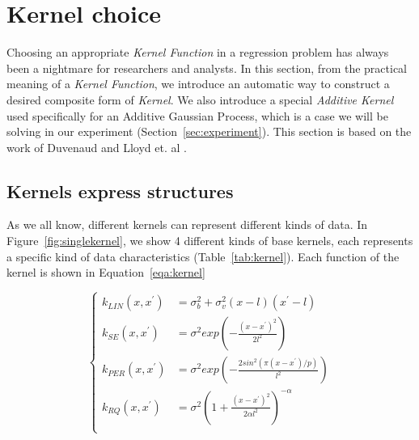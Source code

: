 \section{Kernel choice} \label{sec:autokernel}
Choosing an appropriate \emph{Kernel Function} in a regression problem has always been a nightmare for researchers and analysts. In this section, from the practical meaning of a \emph{Kernel Function}, we introduce an automatic way to construct a desired composite form of \emph{Kernel}.
We also introduce a special \emph{Additive Kernel} used specifically for an Additive Gaussian Process, which is a case we will be solving in our experiment (Section~\ref{sec:experiment}).
This section is based on the work of Duvenaud and Lloyd et. al \cite{duvenaud2013structure,lloyd2014automatic,duvenaud2014automatic,duvenaud2011additive}.


\subsection{Kernels express structures}


As we all know, different kernels can represent different kinds of data. In Figure~\ref{fig:singlekernel}, we show 4 different kinds of base kernels, each represents a specific kind of data characteristics (Table~\ref{tab:kernel}). Each function of the kernel is shown in Equation~\ref{eqa:kernel}


\begin{equation}
\left \{
\begin{aligned} \label{eqa:kernel}
k_{LIN}(x,x^{'}) &= \sigma_{b}^{2} + \sigma_{v}^{2} (x-l)(x^{'}-l) 	\\
k_{SE}(x,x^{'}) &= \sigma^2 exp(-\frac{(x-x^{'})^2}{2l^2})	\\
k_{PER}(x,x^{'}) &= \sigma^2 exp(-\frac{2sin^2 (\pi(x-x^{'})/p)}{l^2})	\\
k_{RQ}(x,x^{'}) &= \sigma^2 (1+\frac{(x-x^{'})^2}{2\alpha l^2})^{-\alpha}	\\
\end{aligned}
\right.
\end{equation}


